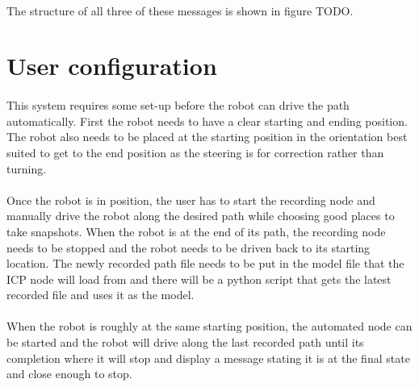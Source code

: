 \paragraph{}
The structure of all three of these messages is shown in figure TODO.


\section{User configuration}
\paragraph{}
This system requires some set-up before the robot can drive the path automatically. First the robot needs to have a clear starting and ending position. The robot also needs to be placed at the starting position in the orientation best suited to get to the end position as the steering is for correction rather than turning.

\paragraph{}
Once the robot is in position, the user has to start the recording node and manually drive the robot along the desired path while choosing good places to take snapshots. When the robot is at the end of its path, the recording node needs to be stopped and the robot needs to be driven back to its starting location. The newly recorded path file needs to be put in the model file that the ICP node will load from and there will be a python script that gets the latest recorded file and uses it as the model.

\paragraph{}
When the robot is roughly at the same starting position, the automated node can be started and the robot will drive along the last recorded path until its completion where it will stop and display a message stating it is at the final state and close enough to stop.

